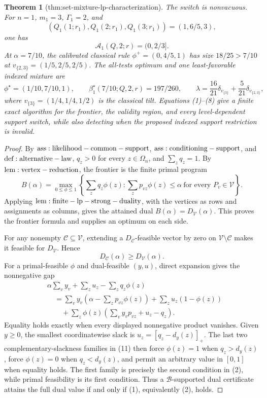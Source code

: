 \documentclass{article}
\newtheorem{theorem}{Theorem}
\begin{document}
\begin{theorem}[thm:set-mixture-lp-characterization]
The switch is nonvacuous. For \(n=1\), \(m_1=3\), \(\Gamma_1=2\), and
\[
 (Q_1(1;r_1),Q_1(2;r_1),Q_1(3;r_1))=(1,6/5,3),
\]
one has
\[
 \mathcal A_1(Q,2;r)=(0,2/3].\tag{7}
\]
At \(\alpha=7/10\), the calibrated classical rule \(\phi^+=(0,4/5,1)\) has size \(18/25>7/10\) at \(v_{\{2,3\}}=(1/5,2/5,2/5)\). The all-tests optimum and one least-favorable indexed mixture are
\[
 \phi^\star=(1/10,7/10,1),\qquad \beta_1^\star(7/10;Q,2,r)=197/260,\qquad \lambda=\frac{16}{21}\delta_{v_{\{3\}}}+\frac{5}{21}\delta_{v_{\{2,3\}}},\tag{8}
\]
where \(v_{\{3\}}=(1/4,1/4,1/2)\) is the classical tilt. Equations (1)--(8) give a finite exact algorithm for the frontier, the validity region, and every level-dependent support switch, while also detecting when the proposed indexed support restriction is invalid.
\end{theorem}
\begin{proof}
By \({\rm ass:likelihood-common-support}\), \({\rm ass:conditioning-support}\), and \({\rm def:alternative-law}\), \(q_z>0\) for every \(z\in\Omega_n\), and \(\sum_zq_z=1\). By \({\rm lem:vertex-reduction}\), the frontier is the finite primal program
\[
 B(\alpha)=\max_{0\leq\phi\leq1}\left\{\sum_zq_z\phi(z):\sum_zp_{vz}\phi(z)\leq\alpha\ \text{for every }P_v\in\mathcal V\right\}.\tag{9}
\]
Applying \({\rm lem:finite-lp-strong-duality}\), with the vertices as rows and assignments as columns, gives the attained dual \(B(\alpha)=D_{\mathcal V}(\alpha)\). This proves the frontier formula and supplies an optimum on each side.

For any nonempty \(\mathcal C\subseteq\mathcal V\), extending a \(D_{\mathcal C}\)-feasible vector by zero on \(\mathcal V\setminus\mathcal C\) makes it feasible for \(D_{\mathcal V}\). Hence
\[
 D_{\mathcal C}(\alpha)\geq D_{\mathcal V}(\alpha).\tag{10}
\]
For a primal-feasible \(\phi\) and dual-feasible \((y,u)\), direct expansion gives the nonnegative gap
\[
 \begin{aligned}
 &\alpha\sum_vy_v+\sum_zu_z-\sum_zq_z\phi(z)\\
 &\quad=\sum_vy_v\left(\alpha-\sum_zp_{vz}\phi(z)\right)+\sum_zu_z(1-\phi(z))\\
 &\qquad+\sum_z\phi(z)\left(\sum_vy_vp_{vz}+u_z-q_z\right).
 \end{aligned}\tag{11}
\]
Equality holds exactly when every displayed nonnegative product vanishes. Given \(y\geq0\), the smallest coordinatewise slack is \(u_z=[q_z-d_y(z)]_+\). The last two complementary-slackness families in (11) then force \(\phi(z)=1\) when \(q_z>d_y(z)\), force \(\phi(z)=0\) when \(q_z<d_y(z)\), and permit an arbitrary value in \([0,1]\) when equality holds. The first family is precisely the second condition in (2), while primal feasibility is its first condition. Thus a \(\mathcal B\)-supported dual certificate attains the full dual value if and only if (1), equivalently (2), holds.


\end{proof}
\end{document}

